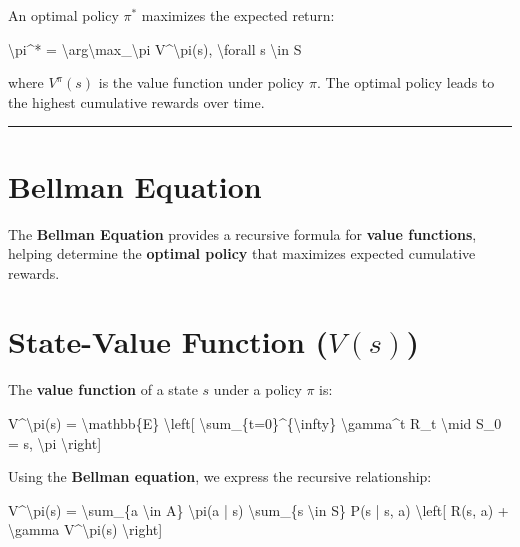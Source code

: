 \documentclass[
]{book}
\newenvironment{Shaded}{\begin{snugshade}}{\end{snugshade}}
\newcommand{\NormalTok}[1]{#1}
\begin{document}
An optimal policy \(\pi^*\) maximizes the expected return:

\begin{Shaded}
\begin{Highlighting}[]
\NormalTok{\textbackslash{}pi\^{}* = \textbackslash{}arg\textbackslash{}max\_\textbackslash{}pi V\^{}\textbackslash{}pi(s), \textbackslash{}forall s \textbackslash{}in S}
\end{Highlighting}
\end{Shaded}

where \(V^\pi(s)\) is the value function under policy \(\pi\). The optimal policy leads to the highest cumulative rewards over time.

\begin{center}\rule{0.5\linewidth}{0.5pt}\end{center}

\section{\texorpdfstring{\textbf{Bellman Equation}}{Bellman Equation}}\label{bellman-equation}

The \textbf{Bellman Equation} provides a recursive formula for \textbf{value functions}, helping determine the \textbf{optimal policy} that maximizes expected cumulative rewards.

\section{\texorpdfstring{\textbf{State-Value Function (\(V(s)\))}}{State-Value Function (V(s))}}\label{state-value-function-vs}

The \textbf{value function} of a state \(s\) under a policy \(\pi\) is:

\begin{Shaded}
\begin{Highlighting}[]
\NormalTok{V\^{}\textbackslash{}pi(s) = \textbackslash{}mathbb\{E\} \textbackslash{}left[ \textbackslash{}sum\_\{t=0\}\^{}\{\textbackslash{}infty\} \textbackslash{}gamma\^{}t R\_t \textbackslash{}mid S\_0 = s, \textbackslash{}pi \textbackslash{}right]}
\end{Highlighting}
\end{Shaded}

Using the \textbf{Bellman equation}, we express the recursive relationship:

\begin{Shaded}
\begin{Highlighting}[]
\NormalTok{V\^{}\textbackslash{}pi(s) = \textbackslash{}sum\_\{a \textbackslash{}in A\} \textbackslash{}pi(a | s) \textbackslash{}sum\_\{s\textquotesingle{} \textbackslash{}in S\} P(s\textquotesingle{} | s, a) \textbackslash{}left[ R(s, a) + \textbackslash{}gamma V\^{}\textbackslash{}pi(s\textquotesingle{}) \textbackslash{}right]}
\end{Highlighting}
\end{Shaded}
\end{document}
